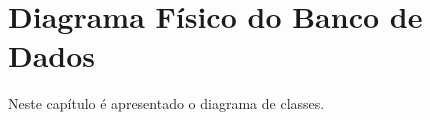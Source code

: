 \chapter{Diagrama Físico do Banco de Dados} \label{cha:diagramabanco}

Neste capítulo é apresentado o diagrama de classes.

